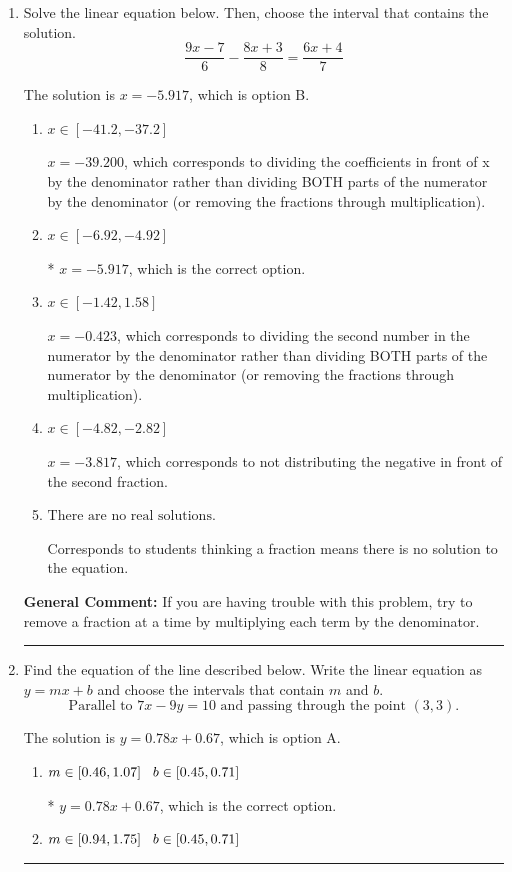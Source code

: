 \documentclass{extbook}[14pt]
\newcommand{\litem}[1]{\item #1

\rule{\textwidth}{0.4pt}}
\begin{document}
\begin{enumerate}\litem{
Solve the linear equation below. Then, choose the interval that contains the solution.
\[ \frac{9x -7}{6} - \frac{8x + 3}{8} = \frac{6x + 4}{7} \]

The solution is \( x = -5.917 \), which is option B.\begin{enumerate}[label=\Alph*.]
\item \( x \in [-41.2, -37.2] \)

 $x = -39.200$, which corresponds to dividing the coefficients in front of x by the denominator rather than dividing BOTH parts of the numerator by the denominator (or removing the fractions through multiplication).
\item \( x \in [-6.92, -4.92] \)

* $x = -5.917$, which is the correct option.
\item \( x \in [-1.42, 1.58] \)

 $x = -0.423$, which corresponds to dividing the second number in the numerator by the denominator rather than dividing BOTH parts of the numerator by the denominator (or removing the fractions through multiplication).
\item \( x \in [-4.82, -2.82] \)

 $x = -3.817$, which corresponds to not distributing the negative in front of the second fraction.
\item \( \text{There are no real solutions.} \)

Corresponds to students thinking a fraction means there is no solution to the equation.
\end{enumerate}

\textbf{General Comment:} If you are having trouble with this problem, try to remove a fraction at a time by multiplying each term by the denominator.
}
\litem{
Find the equation of the line described below. Write the linear equation as $ y=mx+b $ and choose the intervals that contain $m$ and $b$.
\[ \text{Parallel to } 7 x - 9 y = 10 \text{ and passing through the point } (3, 3). \]

The solution is \( y = 0.78x + 0.67 \), which is option A.\begin{enumerate}[label=\Alph*.]
\item \( m \in [0.46, 1.07] \hspace*{3mm} b \in [0.45, 0.71] \)

* $y = 0.78x + 0.67$, which is the correct option.
\item \( m \in [0.94, 1.75] \hspace*{3mm} b \in [0.45, 0.71] \)


\end{enumerate}}
\end{enumerate}
\end{document}
